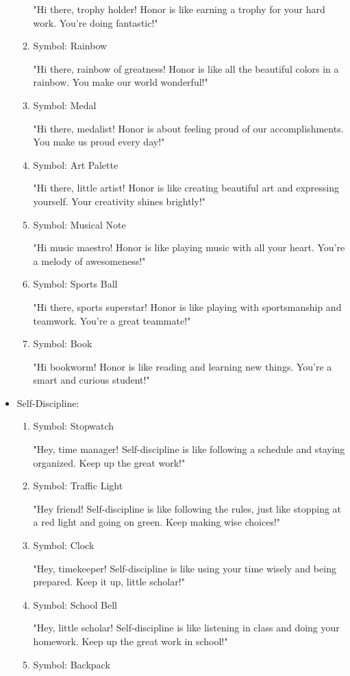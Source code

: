 \documentclass[14pt, letterpaper, twoside]{article}
\begin{document}
\begin{itemize}
\begin{enumerate}
		"Hi there, trophy holder! Honor is like earning a trophy for your hard work. 
		You're doing fantastic!"
		\item Symbol: Rainbow 
		
		"Hi there, rainbow of greatness! Honor is like all the beautiful colors in a 
		rainbow. You make our world wonderful!"
		\item Symbol: Medal 
		
		"Hi there, medalist! Honor is about feeling proud of our accomplishments. You make
		us proud every day!"
		\item Symbol: Art Palette 
		
		"Hi there, little artist! Honor is like creating beautiful art and expressing
		yourself. Your creativity shines brightly!"
		\item Symbol: Musical Note 
		
		"Hi music maestro! Honor is like playing music with all your heart. You're a
		melody of awesomeness!"
		\item Symbol: Sports Ball 
		
		"Hi there, sports superstar! Honor is like playing with sportsmanship and 
		teamwork. You're a great teammate!"
		\item Symbol: Book 
		
		"Hi bookworm! Honor is like reading and learning new things. You're a smart and
		curious student!"
		\end{enumerate}
	\item Self-Discipline:
		\begin{enumerate}
		\item Symbol: Stopwatch 
		
		"Hey, time manager! Self-discipline is like following a schedule and staying
		organized. Keep up the great work!"
		\item Symbol: Traffic Light 
		
		"Hey friend! Self-discipline is like following the rules, just like stopping at a
		red light and going on green. Keep making wise choices!"
		\item Symbol: Clock 
		
		"Hey, timekeeper! Self-discipline is like using your time wisely and being
		prepared. Keep it up, little scholar!"
		\item Symbol: School Bell 
		
		"Hey, little scholar! Self-discipline is like listening in class and doing your
		homework. Keep up the great work in school!"
		\item Symbol: Backpack 
		

\end{enumerate}
\end{itemize}
\end{document}

